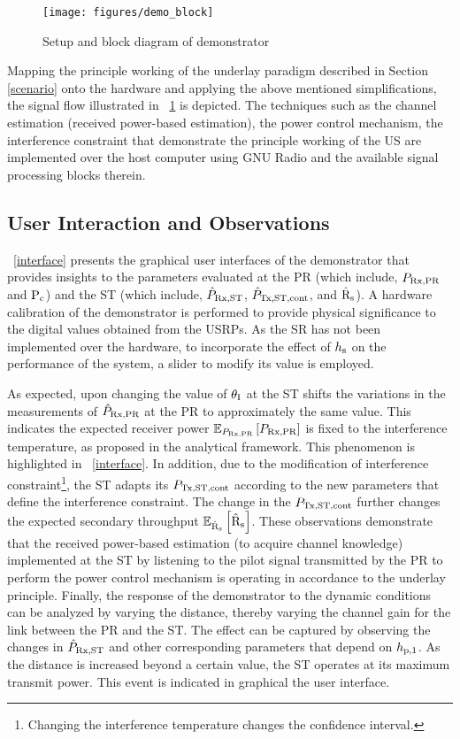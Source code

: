 \begin{figure}
	\centering
	\texttt{[image: figures/demo\_block]}
	\caption{Setup and block diagram of demonstrator}
	\label{demo_blockA}
\end{figure}
Mapping the principle working of the underlay paradigm described in Section \ref{scenario} onto the hardware and applying the above mentioned simplifications, the signal flow illustrated in \figurename~\ref{demo_blockA} is depicted. The techniques such as the channel estimation (received power-based estimation), the power control mechanism, the interference constraint that demonstrate the principle working of the US are implemented over the host computer using GNU Radio and the available signal processing blocks therein.


\subsection{User Interaction and Observations}

\figurename~\ref{interface} presents the graphical user interfaces of the demonstrator that provides insights to the parameters evaluated at the PR (which include, $P_{\text{Rx,PR}}$ and $\text{P}_{\text{c}}$) and the ST (which include, $\hat{P}_{\text{Rx,ST}}$, $\hat{P}_{\text{Tx,ST,cont}}$, and $\hat{\text{{R}}}_{\text{s}}$). A hardware calibration of the demonstrator is performed to provide physical significance to the digital values obtained from the USRPs. As the SR has not been implemented over the hardware, to incorporate the effect of $h_{\text{s}}$ on the performance of the system, a slider to modify its value is employed. %

As expected, upon changing the value of $\theta_{\text{I}}$ at the ST shifts the variations in the measurements of $\hat{P}_{\text{Rx,PR}}$ at the PR to approximately the same value. This indicates the expected receiver power ${\mathbb E}_{P_{\text{Rx,PR}}}\left[ P_{\text{Rx,PR}} \right]$ is fixed to the interference temperature, as proposed in the analytical framework. This phenomenon is highlighted in \figurename~\ref{interface}. In addition, due to the modification of interference constraint\footnote{Changing the interference temperature changes the confidence interval.}, the ST adapts its $P_{\text{Tx,ST,cont}}$ according to the new parameters that define the interference constraint. The change in the $P_{\text{Tx,ST,cont}}$ further changes the expected secondary throughput ${\mathbb E}_{\hat{\text{{R}}}_{\text{s}}}\left[ \hat{\text{{R}}}_{\text{s}} \right]$. These observations demonstrate that the received power-based estimation (to acquire channel knowledge) implemented at the ST by listening to the pilot signal transmitted by the PR to perform the power control mechanism is operating in accordance to the underlay principle. Finally, the response of the demonstrator to the dynamic conditions can be analyzed by varying the distance, thereby varying the channel gain for the link between the PR and the ST. The effect can be captured by observing the changes in $\hat{P}_{\text{Rx,ST}}$ and other corresponding parameters that depend on $h_{\text{p,1}}$. As the distance is increased beyond a certain value, the ST operates at its maximum transmit power. This event is indicated in graphical the user interface.

